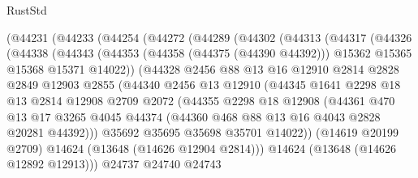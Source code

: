 \begin{lexlean}{RustStd}
\begin{coremodule}
        (@44231
          (@44233
            (@44254
              (@44272
                (@44289
                  (@44302
                    (@44313
                      (@44317
                        (@44326
                          (@44338
                            (@44343
                              (@44353
                                (@44358 (@44375 (@44390 @44392)))
                                @15362
                                @15365
                                @15368
                                @15371
                                @14022))
                            (@44328
                              @2456
                              @88
                              @13
                              @16
                              @12910
                              @2814
                              @2828
                              @2849
                              @12903
                              @2855
                              (@44340
                                @2456
                                @13
                                @12910
                                (@44345
                                  @1641
                                  @2298
                                  @18
                                  @13
                                  @2814
                                  @12908
                                  @2709
                                  @2072
                                  (@44355
                                    @2298
                                    @18
                                    @12908
                                    (@44361
                                      @470
                                      @13
                                      @17
                                      @3265
                                      @4045
                                      @44374
                                      (@44360 @468 @88 @13 @16 @4043 @2828 @20281 @44392)))
                                  @35692
                                  @35695
                                  @35698
                                  @35701
                                  @14022))
                              (@14619 @20199 @2709)
                              @14624
                              (@13648 (@14626 @12904 @2814)))
                            @14624
                            (@13648 (@14626 @12892 @12913)))
                          @24737
                          @24740
                          @24743

\end{coremodule}
\end{lexlean}
